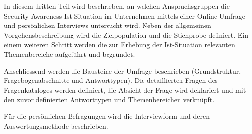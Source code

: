 \begin{sloppypar}
In diesem dritten Teil wird beschrieben, an welchen Anspruchsgruppen die Security Awareness Ist-Situation im Unternehmen mittels einer Online-Umfrage und persönlichen Interviews untersucht wird. Neben der allgemeinen Vorgehensbeschreibung wird die Zielpopulation und die Stichprobe definiert. Ein einem weiteren Schritt werden die zur Erhebung der Ist-Situation relevanten Themenbereiche aufgeführt und begründet.

Anschliessend werden die Bausteine der Umfrage beschrieben (Grundstruktur, Fragebogenabschnitte und Antworttypen). Die detaillierten Fragen des Fragenkataloges werden definiert, die Absicht der Frage wird deklariert und mit den zuvor definierten Antworttypen und Themenbereichen verknüpft.

Für die persönlichen Befragungen wird die Interviewform und deren Auswertungsmethode beschrieben. 
\end{sloppypar}
